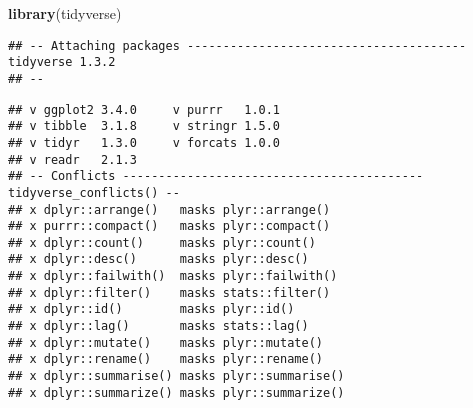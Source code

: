 \documentclass[]{book}
\newenvironment{Shaded}{\begin{snugshade}}{\end{snugshade}}
\newcommand{\KeywordTok}[1]{\textcolor[rgb]{0.13,0.29,0.53}{\textbf{#1}}}
\newcommand{\NormalTok}[1]{#1}
\begin{document}
\begin{Shaded}
\begin{Highlighting}[]
\KeywordTok{library}\NormalTok{(tidyverse)}
\end{Highlighting}
\end{Shaded}

\begin{verbatim}
## -- Attaching packages --------------------------------------- tidyverse 1.3.2
## --
\end{verbatim}

\begin{verbatim}
## v ggplot2 3.4.0     v purrr   1.0.1
## v tibble  3.1.8     v stringr 1.5.0
## v tidyr   1.3.0     v forcats 1.0.0
## v readr   2.1.3     
## -- Conflicts ------------------------------------------ tidyverse_conflicts() --
## x dplyr::arrange()   masks plyr::arrange()
## x purrr::compact()   masks plyr::compact()
## x dplyr::count()     masks plyr::count()
## x dplyr::desc()      masks plyr::desc()
## x dplyr::failwith()  masks plyr::failwith()
## x dplyr::filter()    masks stats::filter()
## x dplyr::id()        masks plyr::id()
## x dplyr::lag()       masks stats::lag()
## x dplyr::mutate()    masks plyr::mutate()
## x dplyr::rename()    masks plyr::rename()
## x dplyr::summarise() masks plyr::summarise()
## x dplyr::summarize() masks plyr::summarize()
\end{verbatim}
\end{document}

